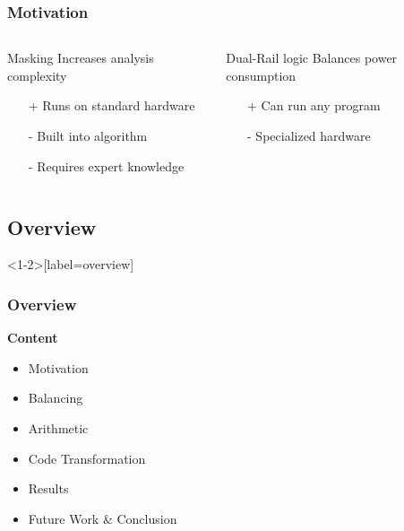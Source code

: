 \documentclass[11pt,t,usepdftitle=false,aspectratio=169]{beamer}
\newcommand{\vq}{\vphantom{q}}
\begin{document}
\begin{frame}
  \frametitle{Motivation}
  \vfill
  \begin{columns}[T]
    \begin{column}{0.48\textwidth}
      \begin{block}{Masking}
        Increases analysis complexity
        \begin{itemize}
        \item[+] Runs on standard hardware
        \item[-] Built into algorithm
        \item[-] Requires expert knowledge
        \end{itemize}
      \end{block}
    \end{column}
    \begin{column}{0.48\textwidth}
      \begin{block}{Dual-Rail logic}
        Balances power consumption
        \begin{itemize}
        \item[+] Can run any program
        \item[-] Specialized hardware
        \item[] \vq
        \end{itemize}
      \end{block}
    \end{column}
  \end{columns}
  \vfill
  \vfill
\end{frame}

\subsection{Overview}

\begin{frame}<1-2>[label=overview]
  \frametitle{Overview}
  \vfill
  \textbf{Content}

  \begin{itemize}
  \item Motivation
  \item \textcolor<2>{uibkorange}{Balancing}
  \item \textcolor<3>{uibkorange}{Arithmetic}
  \item \textcolor<4>{uibkorange}{Code Transformation}
  \item \textcolor<5>{uibkorange}{Results}
  \item \textcolor<6>{uibkorange}{Future Work \& Conclusion}
  \end{itemize}
  \vfill
\end{frame}
\end{document}
